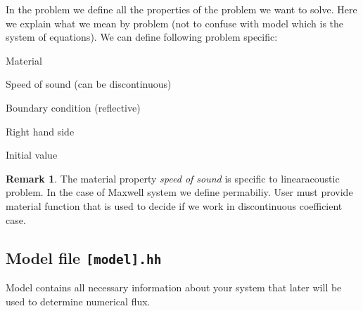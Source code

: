 \documentclass[a4paper,12pt]{article}
\theoremstyle{definition}
\theoremstyle{definition}
\newtheorem{Rem}[Def]{Remark}
\begin{document}
In the problem we define all the properties of the problem we want to solve. Here we explain what we mean by problem (not to confuse with model which is the system of equations). We can define following problem specific:

Material



Speed of sound (can be discontinuous)




Boundary condition (reflective)




Right hand side



Initial value



\begin{Rem}
	The material property \textit{speed of sound} is specific to linearacoustic problem. In the case of Maxwell system we define permabiliy. User must provide material function that is used to decide if we work in discontinuous coefficient case.
\end{Rem}


\subsection{Model file \lstinline{[model].hh} }

Model contains all necessary information about your system that later will be used to determine numerical flux.





\end{document}
